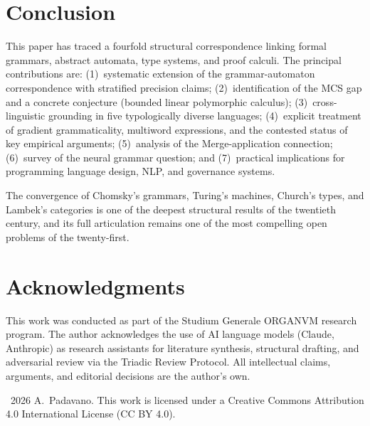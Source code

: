 \documentclass[12pt,a4paper]{article}
\begin{document}
\section{Conclusion}

This paper has traced a fourfold structural correspondence linking formal
grammars, abstract automata, type systems, and proof calculi. The principal
contributions are: (1)~systematic extension of the grammar-automaton
correspondence with stratified precision claims; (2)~identification of the MCS
gap and a concrete conjecture (bounded linear polymorphic calculus);
(3)~cross-linguistic grounding in five typologically diverse languages;
(4)~explicit treatment of gradient grammaticality, multiword expressions, and
the contested status of key empirical arguments; (5)~analysis of the
Merge-application connection; (6)~survey of the neural grammar question; and
(7)~practical implications for programming language design, NLP, and governance
systems.

The convergence of Chomsky's grammars, Turing's machines, Church's types, and
Lambek's categories is one of the deepest structural results of the twentieth
century, and its full articulation remains one of the most compelling open
problems of the twenty-first.

\section*{Acknowledgments}

This work was conducted as part of the Studium Generale ORGANVM research
program. The author acknowledges the use of AI language models (Claude,
Anthropic) as research assistants for literature synthesis, structural
drafting, and adversarial review via the Triadic Review Protocol. All
intellectual claims, arguments, and editorial decisions are the author's own.

\medskip
\noindent\textcopyright~2026 A.~Padavano. This work is licensed under a
Creative Commons Attribution 4.0 International License (CC BY 4.0).
\end{document}
